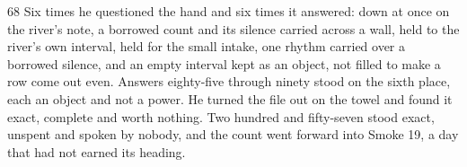 \begin{CRchronicle}{68}
Six times he questioned the hand and six times it answered: down at once on the river’s note, a borrowed count and its silence carried across a wall, held to the river’s own interval, held for the small intake, one rhythm carried over a borrowed silence, and an empty interval kept as an object, not filled to make a row come out even. Answers eighty-five through ninety stood on the sixth place, each an object and not a power. He turned the file out on the towel and found it exact, complete and worth nothing. Two hundred and fifty-seven stood exact, unspent and spoken by nobody, and the count went forward into Smoke 19, a day that had not earned its heading.
\end{CRchronicle}
